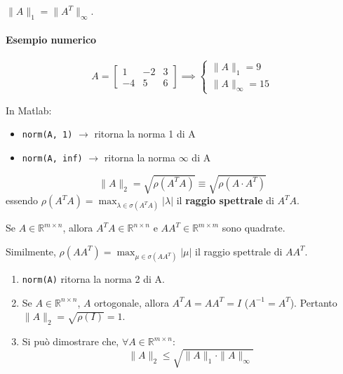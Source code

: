 \begin{osservazione}
$\| A \|_1 = \| A^T \|_\infty$.
\end{osservazione}

\paragraph{Esempio numerico}
$$ A = \begin{bmatrix} 1 & -2 & 3 \\ -4 & 5 & 6 \end{bmatrix} \implies \begin{cases} \| A \|_1 = 9 \\ \| A \|_\infty = 15 \end{cases} $$

\begin{osservazione}
In Matlab:
\begin{itemize}
    \item \texttt{norm(A, 1)} $\to$ ritorna la norma 1 di A
    \item \texttt{norm(A, inf)} $\to$ ritorna la norma $\infty$ di A
\end{itemize}
\end{osservazione}

$$ \| A \|_2 = \sqrt{\rho(A^T A)} \equiv \sqrt{\rho(A \cdot A^T)} $$
essendo $\rho(A^T A) = \max_{\lambda \in \sigma(A^T A)} |\lambda|$ il \textbf{raggio spettrale} di $A^T A$.

\begin{osservazione}
Se $A \in \mathbb{R}^{m \times n}$, allora $A^T A \in \mathbb{R}^{n \times n}$ e $A A^T \in \mathbb{R}^{m \times m}$ sono quadrate.
\end{osservazione}

Similmente, $\rho(A A^T) = \max_{\mu \in \sigma(A A^T)} |\mu|$ il raggio spettrale di $A A^T$.

\begin{osservazione}
\begin{enumerate}
    \item \texttt{norm(A)} ritorna la norma 2 di A.
    \item Se $A \in \mathbb{R}^{n \times n}$, $A$ ortogonale, allora $A^T A = A A^T = I$ ($A^{-1} = A^T$).
    Pertanto $\| A \|_2 = \sqrt{\rho(I)} = 1$.
    \item Si può dimostrare che, $\forall A \in \mathbb{R}^{m \times n}$:
    $$ \| A \|_2 \le \sqrt{\| A \|_1 \cdot \| A \|_\infty} $$
\end{enumerate}
\end{osservazione}


